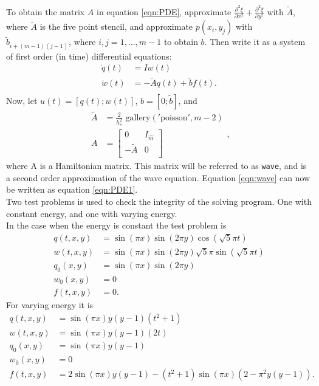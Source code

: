 \noindent To obtain the matrix $A$ in equation \eqref{eqn:PDE}, approximate $\frac{\partial^2 \xi}{\partial x^2}+ \frac{\partial^2 \xi}{\partial y^2}$ with $\tilde{A}$, where $\tilde{A}$ is the five point stencil\cite{fivepoint}, and approximate $p(x_i,y_j)$ with $\tilde{b}_{i+(m-1)(j-1)}$, where $i,j = 1,\dots,m-1$ to obtain $b$. Then write it as a system of first order (in time) differential equations:
\begin{equation*}
\begin{aligned}
\dot{q}(t) &= I w(t) \\
\dot{w}(t) & = -\tilde{A} q(t) + \tilde{b} f(t). \\
\end{aligned}
\end{equation*}
Now, let $u(t) = [q(t);w(t)]$, $ b =[0; \tilde{b}] $, and
\begin{equation*}
\begin{aligned}
\tilde{A} &= \frac{2}{h_s^2} \text{ gallery}('\text{poisson}', m-2) \\
A &= 
\begin{bmatrix}
 0 & I_{\hat{m}} \\ - \tilde{A} & 0 \\
\end{bmatrix}
\end{aligned},
\end{equation*}
where A is a Hamiltonian matrix. This matrix will be referred to as \texttt{wave}, and is a second order approximation of the wave equation. Equation \eqref{eqn:wave} can now be written as equation \eqref{eqn:PDE1}. \\

\noindent Two test problems is used to check the integrity of the solving program. One with constant energy, and one with varying energy. \\

\noindent In the case when the energy is constant the test problem is 
\begin{equation*}
\begin{aligned}
q(t,x,y) &= \sin(\pi x) \sin( 2 \pi y) \cos(\sqrt{5} \pi t) \\
w (t,x,y) &= \sin(\pi x) \sin( 2 \pi y) \sqrt{5} \pi \sin(\sqrt{5} \pi t) \\
q_0(x,y) &= \sin( \pi x) \sin(2 \pi y) \\
w_0(x,y) & = 0 \\
f(t,x,y) &= 0 .
\end{aligned}
\end{equation*}
For varying energy it is
\begin{equation*}
\begin{aligned}
q(t,x,y) &= \sin(\pi x) y (y-1) (t^2+1) \\
w(t,x,y) &= \sin(\pi x) y (y-1) (2 t) \\
q_0(x,y) &= \sin(\pi x) y (y-1) \\
w_0(x,y) & = 0 \\
f(t,x,y) & = 2  \sin(\pi x) y (y-1) -(t^2+1) \sin(\pi x) (2-\pi^2 y (y-1)).
\end{aligned}
\end{equation*}

